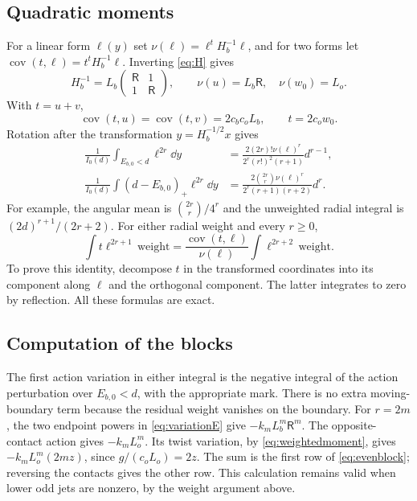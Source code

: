 \subsection{Quadratic moments}
For a linear form $\ell(y)$ set
$\nu(\ell)=\ell^tH_b^{-1}\ell$, and for two forms let
$\operatorname{cov}(t,\ell)=t^tH_b^{-1}\ell$.
Inverting \eqref{eq:H} gives
\begin{equation}\label{eq:covariances}
 H_b^{-1}=L_b\begin{pmatrix}\mathsf R&1\\1&\mathsf R\end{pmatrix},
 \qquad \nu(u)=L_b\mathsf R,\quad \nu(w_0)=L_o.
\end{equation}
With $t=u+v$,
\begin{equation}\label{eq:tcov}
 \operatorname{cov}(t,u)=\operatorname{cov}(t,v)
        =2c_bc_oL_b,\qquad t=2c_ow_0.
\end{equation}
Rotation after the transformation $y=H_b^{-1/2}x$ gives
\begin{align}
 \frac1{I_0(d)}\int_{E_{b,0}<d}\ell^{2r}\dd y
 &=\frac{2(2r)!\nu(\ell)^r}{2^r(r!)^2(r+1)}d^{r-1},
                                          \label{eq:diskmoment}\\
 \frac1{I_0(d)}\int(d-E_{b,0})_+\ell^{2r}\dd y
 &=\frac{2\binom{2r}{r}\nu(\ell)^r}{2^r(r+1)(r+2)}d^r.
                                          \label{eq:weightedmoment}
\end{align}
For example, the angular mean is
$\binom{2r}{r}/4^r$ and the unweighted radial integral is
$(2d)^{r+1}/(2r+2)$. For either radial weight and every $r\ge0$,
\begin{equation}\label{eq:crossmoment}
 \int t\ell^{2r+1}\,\mathrm{weight}
   =\frac{\operatorname{cov}(t,\ell)}{\nu(\ell)}
             \int\ell^{2r+2}\,\mathrm{weight}.
\end{equation}
To prove this identity, decompose $t$ in the transformed coordinates
into its component along $\ell$ and the orthogonal component. The latter
integrates to zero by reflection. All these formulas are exact.

\subsection{Computation of the blocks}
The first action variation in either integral is the negative integral
of the action perturbation over $E_{b,0}<d$, with the appropriate mark.
There is no extra moving-boundary term because the residual weight
vanishes on the boundary.
For $r=2m$, the two endpoint powers in \eqref{eq:variationE} give
$-k_mL_b^m\mathsf R^m$. The opposite-contact action gives
$-k_mL_o^m$. Its twist variation, by \eqref{eq:weightedmoment}, gives
$-k_mL_o^m(2mz)$, since $g/(c_oL_o)=2z$.
The sum is the first row of \eqref{eq:evenblock}; reversing the
contacts gives the other row. This calculation remains valid when
lower odd jets are nonzero, by the weight argument above.

